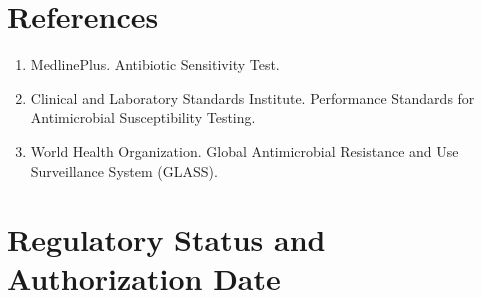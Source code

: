 \section*{References}
\begin{enumerate}
  \item MedlinePlus. Antibiotic Sensitivity Test.
  \item Clinical and Laboratory Standards Institute. Performance Standards for Antimicrobial Susceptibility Testing.
  \item World Health Organization. Global Antimicrobial Resistance and Use Surveillance System (GLASS).
\end{enumerate}

\clearpage


\section*{Regulatory Status and Authorization Date}

\clearpage

